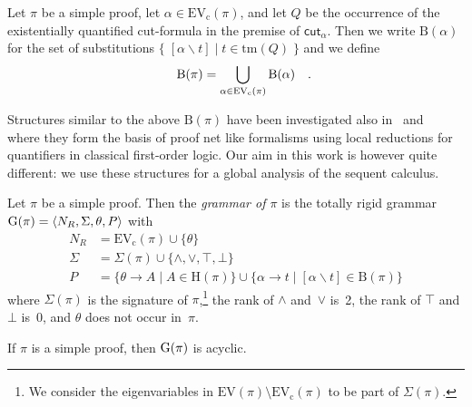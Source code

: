 \documentclass{LMCS}
\theoremstyle{plain}
\theoremstyle{definition}
\def\set#1{\{#1\}}
\def\tuple#1{\langle#1\rangle}
\def\cutr{\mathsf{cut}}
\def\quadfs {\rlap{\rm\quad.}}\def\quadcm {\rlap{\rm\quad,}}\def\quadsc {\rlap{\rm\quad;}}\def\quadcl {\rlap{\rm\quad:}}\def\quadqm {\rlap{\rm\quad?}}
\newcommand{\union}{\cup}
\newcommand{\Union}{\bigcup}
\newcommand{\sop}{[}
\newcommand{\scl}{]}
\newcommand{\sel}[2]{#1 \backslash #2}
\newcommand{\unsubst}[2]{\sop \sel{#1}{#2} \scl}
\newcommand{\EV}{\mathrm{EV}}	\newcommand{\EVc}{\mathrm{EV_c}}	\newcommand{\Hseq}{\mathrm{H}}	\newcommand{\Bsub}{\mathrm{B}}	\newcommand{\terms}[1]{\mathrm{tm}(#1)}	\newcommand{\ev}[1]{\mathrm{ev}(#1)}	\newcommand{\cred}{\rightsquigarrow}	\newcommand{\credm}{\stackrel{\mathit{ne}}{\rightsquigarrow}}	\newcommand{\genrel}{\longrightarrow}
\newcommand{\cutrr}[1]{\cutr_{#1}}
\begin{document}
\begin{defi}
Let $\pi$ be a simple proof, let
$\alpha\in\EVc(\pi)$, and let $Q$ be the occurrence of the
existentially quantified cut-formula in the premise of
$\cutrr{\alpha}$. Then we write $\Bsub(\alpha)$ for the set of
substitutions $\set{\;\unsubst{\alpha}{t} \mid t\in\terms{Q}\;}$ and
we define $$\Bsub(\pi)=\Union_{\alpha\in\EVc(\pi)} \Bsub(\alpha)\quadfs$$
\end{defi}

Structures similar to the above $\Bsub(\pi)$ have been investigated
also in~\cite{Heijltjes10Classical} and~\cite{McKinley13Proof}
where they form the basis of proof net like formalisms using local
reductions for quantifiers in classical first-order logic.  Our aim in
this work is however quite different: we use these structures for a
global analysis of the sequent calculus.

\begin{defi}
Let $\pi$ be a simple proof. Then the
\emph{grammar of $\pi$} is the totally rigid
grammar $\Gram{\pi}=\tuple{N_R,\Sigma,\theta,P}$ with
\begin{align*}
  N_R&=\EVc(\pi)\cup\set{\theta}\\
  \Sigma&=\Sigma(\pi) \union \set{\land,\lor,\top,\bot}\\
  P&=\set{\theta\to A \mid A\in \Hseq(\pi)}\union 
\set{\alpha\to t \mid \unsubst{\alpha}{t}\in\Bsub(\pi)}
\end{align*}
where $\Sigma(\pi)$ is the signature of $\pi$,\footnote{We consider the
  eigenvariables in $\EV(\pi)\setminus\EVc(\pi)$ to be part of
  $\Sigma(\pi)$.} the rank of $\land$ and~$\lor$ is~2, the rank of
$\top$ and $\bot$ is~0, and $\theta$ does not occur in~$\pi$.
\end{defi}



\begin{lem}\label{lem.simple_acyclic}
  If $\pi$ is a simple proof, then $\mathrm{G}(\pi)$ is acyclic.
\end{lem}
\end{document}
